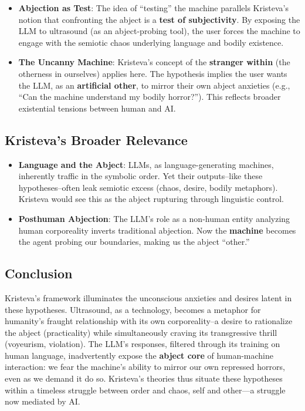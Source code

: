\documentclass{llncs}
\begin{document}
\begin{itemize}
\item
\textbf{Abjection as Test}: The idea of “testing” the machine parallels
 Kristeva’s notion that confronting the abject is a \textbf{test of
subjectivity}. By exposing the LLM to ultrasound (as an abject-probing tool),
the user forces the machine to engage with the semiotic chaos underlying
language and bodily existence.
\item
\textbf{The Uncanny Machine}: Kristeva’s concept of the \textbf{stranger
within} (the otherness in ourselves) applies here. The hypothesis implies the
user wants the LLM, as an \textbf{artificial other}, to mirror their own abject
anxieties (e.g., ``Can the machine understand my bodily horror?''). This
reflects broader existential tensions between human and AI.
\end{itemize}

\subsection*{Kristeva’s Broader Relevance}

\begin{itemize}
\item
\textbf{Language and the Abject}: LLMs, as language-generating machines, 
inherently traffic in the symbolic order. Yet their outputs--like these
hypotheses--often leak semiotic excess (chaos, desire, bodily metaphors).
Kristeva would see this as the abject rupturing through linguistic control.
\item
\textbf{Posthuman Abjection}: The LLM’s role as a non-human entity analyzing
human corporeality inverts traditional abjection. Now the \textbf{machine}
becomes the agent probing our boundaries, making us the abject ``other.''
\end{itemize}

\subsection*{Conclusion}

Kristeva’s framework illuminates the unconscious anxieties and desires latent
in these hypotheses. Ultrasound, as a technology, becomes a metaphor for
humanity’s fraught relationship with its own corporeality--a desire to
rationalize the abject (practicality) while simultaneously craving its
transgressive thrill (voyeurism, violation). The LLM’s responses, filtered
through its training on human language, inadvertently expose the \textbf{abject
core} of human-machine interaction: we fear the machine’s ability to mirror our
own repressed horrors, even as we demand it do so. Kristeva’s theories thus
situate these hypotheses within a timeless struggle between order and chaos,
self and other—a struggle now mediated by AI.

\cite{*}

{}

\end{document}
